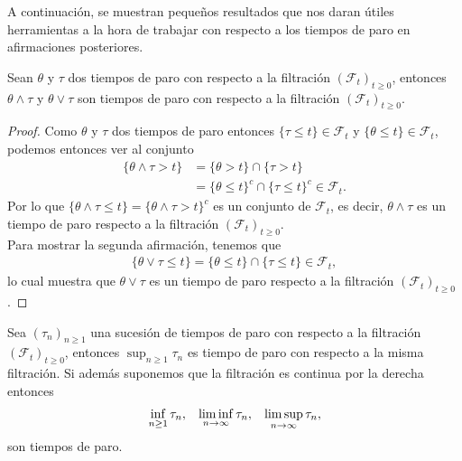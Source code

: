 A continuación, se muestran pequeños resultados que nos daran útiles herramientas a la hora de trabajar con respecto a los tiempos de paro en afirmaciones posteriores.
\begin{lemma}
	\label{paromaxmin}
	Sean $\theta$ y $\tau$ dos tiempos de paro con respecto a la filtración $(\mathcal{F}_t)_{t \geq 0}$, entonces $\theta \wedge \tau$ y $\theta \vee \tau$ son tiempos de paro con respecto a la filtración $(\mathcal{F}_t)_{t \geq 0}$.
\end{lemma}
\begin{proof}
	Como $\theta$ y $\tau$ dos tiempos de paro entonces $\{\tau \leq t \} \in \mathcal{F}_t$ y $\{\theta \leq t \} \in \mathcal{F}_t$, podemos entonces ver al conjunto
	\begin{align*}
		\{\theta \wedge \tau > t \} & = \{ \theta > t \} \cap \{ \tau > t \} \\
		& = \{ \theta \leq t \}^{c} \cap \{ \tau \leq t \}^{c} \in \mathcal{F}_t.
	\end{align*}
	Por lo que $\{\theta \wedge \tau \leq t \} = \{\theta \wedge \tau > t \}^{c}$ es un conjunto de $\mathcal{F}_t$, es decir, $\theta \wedge \tau$ es un tiempo de paro respecto a la filtración $(\mathcal{F}_t)_{t \geq 0}$. \\

	Para mostrar la segunda afirmación, tenemos que
	\begin{align*}
		\{ \theta \vee \tau \leq t \} = \{ \theta \leq t \} \cap \{ \tau \leq t \} \in \mathcal{F}_t,
	\end{align*}
	lo cual muestra que $\theta \vee \tau$ es un tiempo de paro respecto a la filtración $(\mathcal{F}_t)_{t \geq 0}$.
\end{proof}

\begin{lemma}
	Sea $(\tau_n)_{n \geq 1}$ una sucesión de tiempos de paro con respecto a la filtración $(\mathcal{F}_t)_{t \geq 0}$, entonces $\sup_{n \geq 1} \tau_n$ es tiempo de paro con respecto a la misma filtración. Si además suponemos que la filtración es continua por la derecha entonces
	\begin{align*}
		\inf_{n \geq 1} \tau_n, \hspace{0.3cm} \liminf_{n \rightarrow \infty} \tau_n, \hspace{0.3cm} \limsup_{n \rightarrow \infty} \tau_n,
	\end{align*}
	son tiempos de paro.
\end{lemma}

